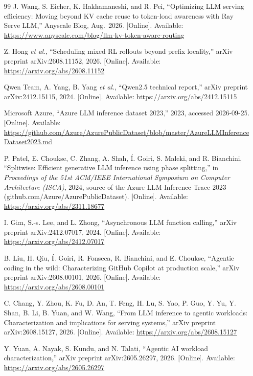 \documentclass[conference]{IEEEtran}
\begin{document}
\begin{thebibliography}{99}
 J. Wang, S. Eicher, K. Hakhamaneshi, and R. Pei, ``Optimizing LLM serving efficiency: Moving beyond KV cache reuse to token-load awareness with Ray Serve LLM,'' Anyscale Blog, Aug.\ 2026. [Online]. Available: \url{https://www.anyscale.com/blog/llm-kv-token-aware-routing}

 Z. Hong \emph{et al.}, ``Scheduling mixed RL rollouts beyond prefix locality,'' arXiv preprint arXiv:2608.11152, 2026. [Online]. Available: \url{https://arxiv.org/abs/2608.11152}

 Qwen Team, A. Yang, B. Yang \emph{et al.}, ``Qwen2.5 technical report,'' arXiv preprint arXiv:2412.15115, 2024. [Online]. Available: \url{https://arxiv.org/abs/2412.15115}

 Microsoft Azure, ``Azure LLM inference dataset 2023,'' 2023, accessed 2026-09-25. [Online]. Available: \url{https://github.com/Azure/AzurePublicDataset/blob/master/AzureLLMInferenceDataset2023.md}

 P. Patel, E. Choukse, C. Zhang, A. Shah, \'I. Goiri, S. Maleki, and R. Bianchini, ``Splitwise: Efficient generative LLM inference using phase splitting,'' in \emph{Proceedings of the 51st ACM/IEEE International Symposium on Computer Architecture (ISCA)}, 2024, source of the Azure LLM Inference Trace 2023 (github.com/Azure/AzurePublicDataset). [Online]. Available: \url{https://arxiv.org/abs/2311.18677}

 I. Gim, S.-s. Lee, and L. Zhong, ``Asynchronous LLM function calling,'' arXiv preprint arXiv:2412.07017, 2024. [Online]. Available: \url{https://arxiv.org/abs/2412.07017}

 B. Liu, H. Qiu, \'I. Goiri, R. Fonseca, R. Bianchini, and E. Choukse, ``Agentic coding in the wild: Characterizing GitHub Copilot at production scale,'' arXiv preprint arXiv:2608.00101, 2026. [Online]. Available: \url{https://arxiv.org/abs/2608.00101}

 C. Chang, Y. Zhou, K. Fu, D. An, T. Feng, H. Lu, S. Yao, P. Guo, Y. Yu, Y. Shan, B. Li, B. Yuan, and W. Wang, ``From LLM inference to agentic workloads: Characterization and implications for serving systems,'' arXiv preprint arXiv:2608.15127, 2026. [Online]. Available: \url{https://arxiv.org/abs/2608.15127}

 Y. Yuan, A. Nayak, S. Kundu, and N. Talati, ``Agentic AI workload characterization,'' arXiv preprint arXiv:2605.26297, 2026. [Online]. Available: \url{https://arxiv.org/abs/2605.26297}

\end{thebibliography}
\end{document}
